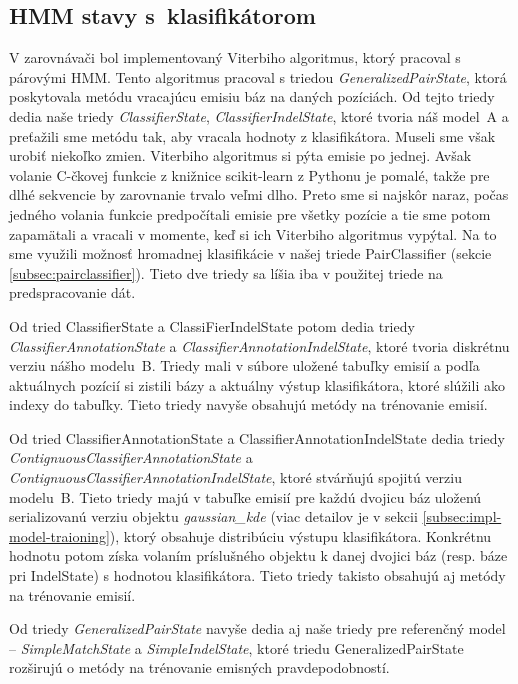 \subsection{HMM stavy s~klasifikátorom}
\label{subsec:hmm-states}

V zarovnávači bol implementovaný Viterbiho algoritmus, ktorý pracoval s párovými HMM. Tento algoritmus pracoval s triedou \textit{GeneralizedPairState}, ktorá poskytovala metódu  vracajúcu emisiu báz na daných pozíciách. Od tejto triedy dedia naše triedy \textit{ClassifierState}, \textit{ClassifierIndelState}, ktoré tvoria náš model~A a preťažili sme metódu  tak, aby vracala hodnoty z klasifikátora. Museli sme však urobiť niekoľko zmien. Viterbiho algoritmus si pýta emisie po jednej. Avšak volanie C-čkovej funkcie z knižnice scikit-learn z Pythonu je pomalé, takže pre dlhé sekvencie by zarovnanie trvalo veľmi dlho. Preto sme si najskôr naraz, počas jedného volania funkcie predpočítali emisie pre všetky pozície a tie sme potom zapamätali a vracali v momente, keď si ich Viterbiho algoritmus vypýtal. Na to sme využili možnosť hromadnej klasifikácie v našej triede PairClassifier (sekcie \ref{subsec:pairclassifier}). Tieto dve triedy sa líšia iba v použitej triede na predspracovanie dát.

Od tried ClassifierState a ClassiFierIndelState potom dedia triedy \textit{ClassifierAnnotationState} a \textit{ClassifierAnnotationIndelState}, ktoré tvoria diskrétnu verziu nášho modelu~B. Triedy mali v súbore uložené tabuľky emisií a podľa aktuálnych pozícií si zistili bázy a aktuálny výstup klasifikátora, ktoré slúžili ako indexy do tabuľky. Tieto triedy navyše obsahujú metódy na trénovanie emisií.

Od tried ClassifierAnnotationState a ClassifierAnnotationIndelState dedia triedy \textit{ContignuousClassifierAnnotationState} a \textit{ContignuousClassifierAnnotationIndelState}, ktoré stvárňujú spojitú verziu modelu~B. Tieto triedy majú v tabuľke emisií pre každú dvojicu báz uloženú serializovanú verziu objektu \textit{gaussian\_kde} (viac detailov je v sekcii \ref{subsec:impl-model-traioning}), ktorý obsahuje distribúciu výstupu klasifikátora. Konkrétnu hodnotu potom získa volaním príslušného objektu k danej dvojici báz (resp. báze pri IndelState) s hodnotou klasifikátora. Tieto triedy takisto obsahujú aj metódy na trénovanie emisií.

Od triedy \textit{GeneralizedPairState} navyše dedia aj naše triedy pre referenčný model -- \textit{SimpleMatchState} a \textit{SimpleIndelState}, ktoré triedu GeneralizedPairState rozširujú o metódy na trénovanie emisných pravdepodobností.

